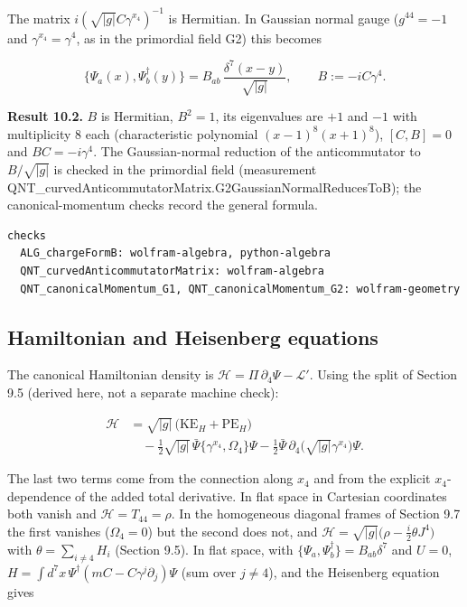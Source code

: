 \documentclass[11pt]{article}
\begin{document}
The matrix $i(\sqrt{|g|}C\gamma^{x_4})^{-1}$ is Hermitian. In Gaussian normal gauge ($g^{44}=-1$ and $\gamma^{x_4}=\gamma^4$, as in the primordial field G2) this becomes

\[
\bigl\{\Psi_a(x),\Psi^\dagger_b(y)\bigr\}=B_{ab}\,\frac{\delta^7(x-y)}{\sqrt{|g|}},\qquad B:=-iC\gamma^4 .
\]

\textbf{Result 10.2.} $B$ is Hermitian, $B^2=1$, its eigenvalues are $+1$ and $-1$ with multiplicity 8 each (characteristic polynomial $(x-1)^8(x+1)^8$), $[C,B]=0$ and $BC=-i\gamma^4$. The Gaussian-normal reduction of the anticommutator to $B/\sqrt{|g|}$ is checked in the primordial field (measurement QNT\_curvedAnticommutatorMatrix.G2GaussianNormalReducesToB); the canonical-momentum checks record the general formula.

\begin{Verbatim}[fontsize=\small]
checks
  ALG_chargeFormB: wolfram-algebra, python-algebra
  QNT_curvedAnticommutatorMatrix: wolfram-algebra
  QNT_canonicalMomentum_G1, QNT_canonicalMomentum_G2: wolfram-geometry
\end{Verbatim}

\subsection{Hamiltonian and Heisenberg equations}

The canonical Hamiltonian density is $\mathcal H=\Pi\,\partial_4\Psi-\mathcal L'$. Using the split of Section 9.5 (derived here, not a separate machine check):

\[
\begin{aligned}
\mathcal H&=\sqrt{|g|}\,\bigl(\mathrm{KE}_H+\mathrm{PE}_H\bigr)\\
&\quad-\tfrac12\sqrt{|g|}\,\bar\Psi\{\gamma^{x_4},\Omega_4\}\Psi-\tfrac12\bar\Psi\,\partial_4\bigl(\sqrt{|g|}\gamma^{x_4}\bigr)\Psi .
\end{aligned}
\]

The last two terms come from the connection along $x_4$ and from the explicit $x_4$-dependence of the added total derivative. In flat space in Cartesian coordinates both vanish and $\mathcal H=T_{44}=\rho$. In the homogeneous diagonal frames of Section 9.7 the first vanishes ($\Omega_4=0$) but the second does not, and $\mathcal H=\sqrt{|g|}\bigl(\rho-\tfrac i2\theta J^4\bigr)$ with $\theta=\sum_{i\ne4}H_i$ (Section 9.5). In flat space, with $\{\Psi_a,\Psi^\dagger_b\}=B_{ab}\delta^7$ and $U=0$, $H=\int d^7x\,\Psi^\dagger(mC-C\gamma^j\partial_j)\Psi$ (sum over $j\ne4$), and the Heisenberg equation gives
\end{document}
